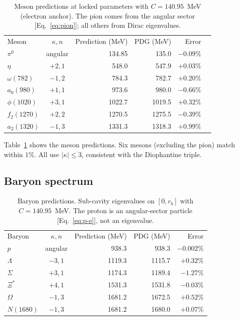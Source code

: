 \documentclass[aps,prd,twocolumn,superscriptaddress,nofootinbib,longbibliography]{revtex4-2}
\begin{document}
\begin{table}[t]
\caption{\label{tab:mesons}%
Meson predictions at locked parameters with $C = 140.95$~MeV
(electron anchor).  The pion comes from the angular sector
[Eq.~\eqref{eq:pion}]; all others from Dirac eigenvalues.}
\begin{ruledtabular}
\begin{tabular}{lcrrrr}
Meson & $\kappa, n$ & Prediction (MeV) & PDG (MeV) & Error \\
\colrule
$\pi^0$       & angular & 134.85 & 135.0  & $-0.09\%$ \\
$\eta$        & $+2, 1$ & 548.0  & 547.9  & $+0.03\%$ \\
$\omega(782)$ & $-1, 2$ & 784.3  & 782.7  & $+0.20\%$ \\
$a_0(980)$    & $+1, 1$ & 973.6  & 980.0  & $-0.66\%$ \\
$\phi(1020)$  & $+3, 1$ & 1022.7 & 1019.5 & $+0.32\%$ \\
$f_2(1270)$   & $+2, 2$ & 1270.5 & 1275.5 & $-0.39\%$ \\
$a_2(1320)$   & $-1, 3$ & 1331.3 & 1318.3 & $+0.99\%$ \\
\end{tabular}
\end{ruledtabular}
\end{table}

Table~\ref{tab:mesons} shows the meson predictions.  Six mesons
(excluding the pion) match within $1\%$.  All use
$|\kappa| \leq 3$, consistent with the Diophantine triple.

\subsection{Baryon spectrum}

\begin{table}[t]
\caption{\label{tab:baryons}%
Baryon predictions.  Sub-cavity eigenvalues on $[0, r_b]$ with
$C = 140.95$~MeV.  The proton is an angular-sector particle
[Eq.~\eqref{eq:p-e}], not an eigenvalue.}
\begin{ruledtabular}
\begin{tabular}{lcrrr}
Baryon & $\kappa, n$ & Prediction (MeV) & PDG (MeV) & Error \\
\colrule
$p$         & angular    & 938.3  & 938.3  & $-0.002\%$ \\
$\Lambda$   & $-3, 1$    & 1119.3 & 1115.7 & $+0.32\%$ \\
$\Sigma$    & $+3, 1$    & 1174.3 & 1189.4 & $-1.27\%$ \\
$\Xi^*$     & $+4, 1$    & 1531.3 & 1531.8 & $-0.03\%$ \\
$\Omega$    & $-1, 3$    & 1681.2 & 1672.5 & $+0.52\%$ \\
$N(1680)$   & $-1, 3$    & 1681.2 & 1680.0 & $+0.07\%$ \\
\end{tabular}
\end{ruledtabular}
\end{table}
\end{document}
